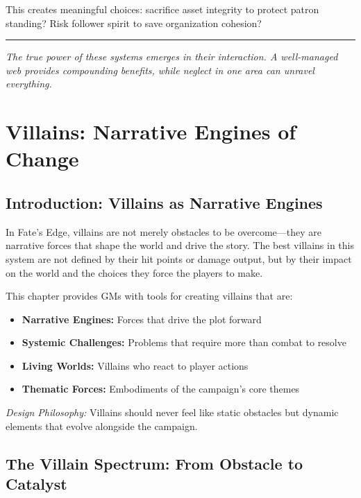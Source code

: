 \documentclass[10pt]{article}
\begin{document}
    This creates meaningful choices: sacrifice asset integrity to protect patron standing? Risk follower spirit to save organization cohesion?
    
    \begin{center}
    \rule{0.8\textwidth}{0.4pt}
    \end{center}
    
    \begin{footnotesize}
    \textit{The true power of these systems emerges in their interaction. A well-managed web provides compounding benefits, while neglect in one area can unravel everything.}
    \end{footnotesize}
           
\section{Villains: Narrative Engines of Change}

\subsection{Introduction: Villains as Narrative Engines}

In Fate's Edge, villains are not merely obstacles to be overcome---they are narrative forces that shape the world and drive the story. The best villains in this system are not defined by their hit points or damage output, but by their impact on the world and the choices they force the players to make.

This chapter provides GMs with tools for creating villains that are:
\begin{itemize}
  \item \textbf{Narrative Engines:} Forces that drive the plot forward
  \item \textbf{Systemic Challenges:} Problems that require more than combat to resolve
  \item \textbf{Living Worlds:} Villains who react to player actions
  \item \textbf{Thematic Forces:} Embodiments of the campaign's core themes
\end{itemize}

\noindent\textit{Design Philosophy:} Villains should never feel like static obstacles but dynamic elements that evolve alongside the campaign.

\subsection{The Villain Spectrum: From Obstacle to Catalyst}
\end{document}
